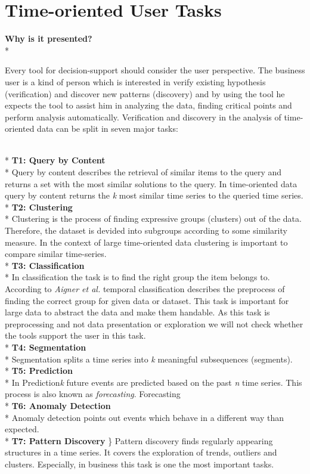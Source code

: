 \section{Time-oriented User Tasks} \label{tasks}
\textbf{Why is it presented?}\\*

Every tool for decision-support should consider the user perspective. The business user is a kind of person which is interested in verify existing hypothesis (verification) and discover new patterns (discovery) and by using the tool he expects the tool to assist him in analyzing the data, finding critical points and perform analysis automatically\cite{Brachman1996}. Verification and discovery in the analysis of time-oriented data can be split in seven major tasks\cite{Esling2012}:

\\*
\textbf{T1: Query by Content}\\*
Query by content describes the retrieval of similar items to the query and returns a set with the most similar solutions to the query. In time-oriented data query by content returns the \textit{k} most similar time series to the queried time series.
\\*
\textbf{T2: Clustering}\\*
Clustering is the process of finding expressive groups (clusters) out of the data. Therefore, the dataset is devided into subgroups according to some similarity measure. In the context of large time-oriented data clustering is important to compare similar time-series.
\\*
\textbf{T3: Classification}\\*
In classification the task is to find the right group the item belongs to. According to \textit{Aigner et al.} temporal classification describes the preprocess of finding the correct group for given data or dataset. This task is important for large data to abstract the data and make them handable. As this task is preprocessing and not data presentation or exploration we will not check whether the tools support the user in this task. 
\\*
\textbf{T4: Segmentation}\\*
Segmentation splits a time series into \textit{k} meaningful subsequences (segments)\cite{batyrshin2007perception}. 
\\*
\textbf{T5: Prediction}\\*
In Prediction\textit{k} future events are predicted based on the past \textit{n} time series. This process is also known as \textit{forecasting}. Forecasting 
\\*
\textbf{T6: Anomaly Detection} \\*
Anomaly detection points out events which behave in a different way than expected.
\\*
\textbf{T7: Pattern Discovery} \}\*
Pattern discovery finds regularly appearing structures in a time series.  It covers the exploration of trends, outliers and clusters. Especially, in business this task is one the most important tasks.


